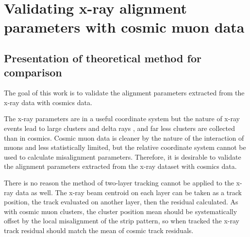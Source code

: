 
\chapter{Validating x-ray alignment parameters with cosmic muon data}

\section{Presentation of theoretical method for comparison}

The goal of this work is to validate the alignment parameters extracted from the x-ray data with cosmics data. 

The x-ray parameters are in a useful coordinate system but the nature of x-ray events lead to large clusters and delta rays \cite{lefebvre_precision_2020}, and far less clusters are collected than in cosmics. Cosmic muon data is cleaner by the nature of the interaction of muons and less statistically limited, but the relative coordinate system cannot be used to calculate misalignment parameters. Therefore, it is desirable to validate the alignment parameters extracted from the x-ray dataset with cosmics data.

There is no reason the method of two-layer tracking cannot be applied to the x-ray data as well. The x-ray beam centroid on each layer can be taken as a track position, the track evaluated on another layer, then the residual calculated. As with cosmic muon clusters, the cluster position mean should be systematically offset by the local misalignment of the strip pattern, so when tracked the x-ray track residual should match the mean of cosmic track residuals. 

